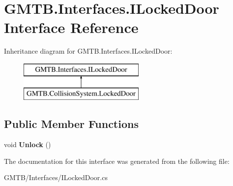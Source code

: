 \hypertarget{interface_g_m_t_b_1_1_interfaces_1_1_i_locked_door}{}\section{G\+M\+T\+B.\+Interfaces.\+I\+Locked\+Door Interface Reference}
\label{interface_g_m_t_b_1_1_interfaces_1_1_i_locked_door}
Inheritance diagram for G\+M\+T\+B.\+Interfaces.\+I\+Locked\+Door\+:\begin{figure}[H]
\begin{center}
\leavevmode
\includegraphics[height=2.000000cm]{interface_g_m_t_b_1_1_interfaces_1_1_i_locked_door}
\end{center}
\end{figure}
\subsection*{Public Member Functions}
\begin{DoxyCompactItemize}
\item 
\mbox{\label{interface_g_m_t_b_1_1_interfaces_1_1_i_locked_door_a851eb9e8fbe12d4ebbffa986fa445e64}} 
void {\bfseries Unlock} ()
\end{DoxyCompactItemize}


The documentation for this interface was generated from the following file\+:\begin{DoxyCompactItemize}
\item 
G\+M\+T\+B/\+Interfaces/I\+Locked\+Door.\+cs\end{DoxyCompactItemize}
